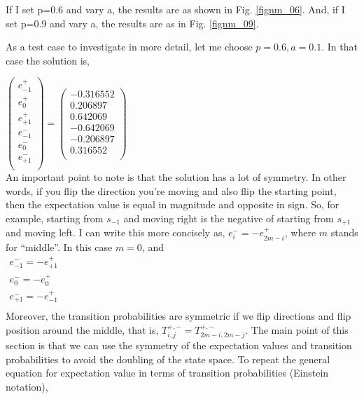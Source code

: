 \documentclass{article}
\begin{document}
If I set p=0.6 and vary a, the results are as shown in Fig. \ref{fignm_06}. And, if I set p=0.9 and vary a, the results are as in Fig. \ref{fignm_09}.

As a test case to investigate in more detail, let me choose $p=0.6, a=0.1$. In that case the solution is,

$
\left(
\begin{array}{c}
 e^{+}_{-1} \\
 e^{+}_{0} \\
 e^{+}_{+1} \\
 e^{-}_{-1} \\
 e^{-}_{0} \\
 e^{-}_{+1} \\
\end{array}
\right) =
\left(
\begin{array}{c}
 -0.316552 \\
 0.206897 \\
 0.642069 \\
 -0.642069 \\
 -0.206897 \\
 0.316552 \\
\end{array}
\right)
$ \\

An important point to note is that the solution has a lot of symmetry. In other words, if you flip the direction you're moving and also flip the starting point, then the expectation value is equal in magnitude and opposite in sign. So, for example, starting from $s_{-1}$ and moving right is the negative of starting from $s_{+1}$ and moving left. I can write this more concisely as, $e^{-}_{i} = -e^{+}_{2m-i}$, where $m$ stands for ``middle''. In this case $m=0$, and \\

$
\begin{array}{c}
e^{-}_{-1} = - e^{+}_{+1} \\
e^{-}_{0} = - e^{+}_{0} \\
e^{-}_{+1} = - e^{+}_{-1} \\
\end{array}
$ \\

Moreover, the transition probabilities are symmetric if we flip directions and flip position around the middle, that is, $T^{+,-}_{i,j} = T^{+,-}_{2 m-i,2 m - j }$. The main point of this section is that we can use the symmetry of the expectation values and transition probabilities to avoid the doubling of the state space. To repeat the general equation for expectation value in terms of transition probabilities (Einstein notation), \\
\end{document}

